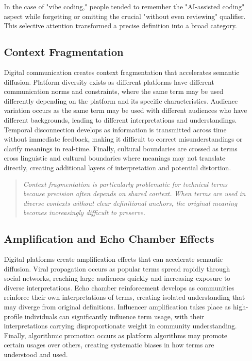 \documentclass[11pt]{article}
\begin{document}
In the case of "vibe coding," people tended to remember the "AI-assisted coding" aspect while forgetting or omitting the crucial "without even reviewing" qualifier. This selective attention transformed a precise definition into a broad category.

\subsection{Context Fragmentation}

Digital communication creates context fragmentation that accelerates semantic diffusion. Platform diversity exists as different platforms have different communication norms and constraints, where the same term may be used differently depending on the platform and its specific characteristics. Audience variation occurs as the same term may be used with different audiences who have different backgrounds, leading to different interpretations and understandings. Temporal disconnection develops as information is transmitted across time without immediate feedback, making it difficult to correct misunderstandings or clarify meanings in real-time. Finally, cultural boundaries are crossed as terms cross linguistic and cultural boundaries where meanings may not translate directly, creating additional layers of interpretation and potential distortion.

\begin{quote}
\emph{Context fragmentation is particularly problematic for technical terms because precision often depends on shared context. When terms are used in diverse contexts without clear definitional anchors, the original meaning becomes increasingly difficult to preserve.}
\end{quote}

\subsection{Amplification and Echo Chamber Effects}

Digital platforms create amplification effects that can accelerate semantic diffusion. Viral propagation occurs as popular terms spread rapidly through social networks, reaching large audiences quickly and increasing exposure to diverse interpretations. Echo chamber reinforcement develops as communities reinforce their own interpretations of terms, creating isolated understanding that may diverge from original definitions. Influencer amplification takes place as high-profile individuals can significantly influence term usage, with their interpretations carrying disproportionate weight in community understanding. Finally, algorithmic promotion occurs as platform algorithms may promote certain usages over others, creating systematic biases in how terms are understood and used.
\end{document}
